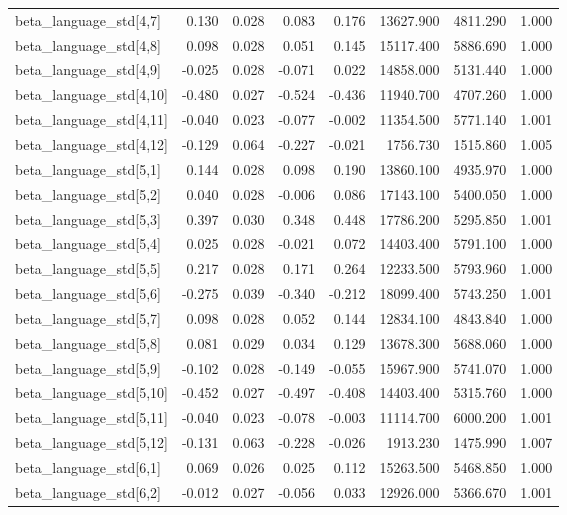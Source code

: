 \begin{tabular}{lrrrrrrr}
beta\_language\_std[4,7] & 0.130 & 0.028 & 0.083 & 0.176 & 13627.900 & 4811.290 & 1.000 \\
beta\_language\_std[4,8] & 0.098 & 0.028 & 0.051 & 0.145 & 15117.400 & 5886.690 & 1.000 \\
beta\_language\_std[4,9] & -0.025 & 0.028 & -0.071 & 0.022 & 14858.000 & 5131.440 & 1.000 \\
beta\_language\_std[4,10] & -0.480 & 0.027 & -0.524 & -0.436 & 11940.700 & 4707.260 & 1.000 \\
beta\_language\_std[4,11] & -0.040 & 0.023 & -0.077 & -0.002 & 11354.500 & 5771.140 & 1.001 \\
beta\_language\_std[4,12] & -0.129 & 0.064 & -0.227 & -0.021 & 1756.730 & 1515.860 & 1.005 \\
beta\_language\_std[5,1] & 0.144 & 0.028 & 0.098 & 0.190 & 13860.100 & 4935.970 & 1.000 \\
beta\_language\_std[5,2] & 0.040 & 0.028 & -0.006 & 0.086 & 17143.100 & 5400.050 & 1.000 \\
beta\_language\_std[5,3] & 0.397 & 0.030 & 0.348 & 0.448 & 17786.200 & 5295.850 & 1.001 \\
beta\_language\_std[5,4] & 0.025 & 0.028 & -0.021 & 0.072 & 14403.400 & 5791.100 & 1.000 \\
beta\_language\_std[5,5] & 0.217 & 0.028 & 0.171 & 0.264 & 12233.500 & 5793.960 & 1.000 \\
beta\_language\_std[5,6] & -0.275 & 0.039 & -0.340 & -0.212 & 18099.400 & 5743.250 & 1.001 \\
beta\_language\_std[5,7] & 0.098 & 0.028 & 0.052 & 0.144 & 12834.100 & 4843.840 & 1.000 \\
beta\_language\_std[5,8] & 0.081 & 0.029 & 0.034 & 0.129 & 13678.300 & 5688.060 & 1.000 \\
beta\_language\_std[5,9] & -0.102 & 0.028 & -0.149 & -0.055 & 15967.900 & 5741.070 & 1.000 \\
beta\_language\_std[5,10] & -0.452 & 0.027 & -0.497 & -0.408 & 14403.400 & 5315.760 & 1.000 \\
beta\_language\_std[5,11] & -0.040 & 0.023 & -0.078 & -0.003 & 11114.700 & 6000.200 & 1.001 \\
beta\_language\_std[5,12] & -0.131 & 0.063 & -0.228 & -0.026 & 1913.230 & 1475.990 & 1.007 \\
beta\_language\_std[6,1] & 0.069 & 0.026 & 0.025 & 0.112 & 15263.500 & 5468.850 & 1.000 \\
beta\_language\_std[6,2] & -0.012 & 0.027 & -0.056 & 0.033 & 12926.000 & 5366.670 & 1.001 \\

\end{tabular}
